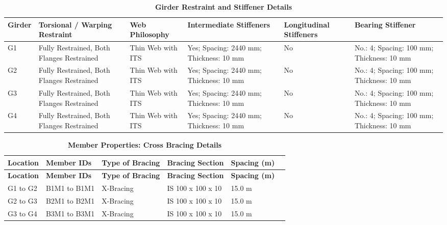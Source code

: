 \documentclass[12pt,a4paper]{report}
\numberwithin{table}{chapter}
\numberwithin{figure}{chapter}
\begin{document}
\vspace{0.6em}

\vspace{4pt}
\begin{table}[H]
\centering
\caption{\textbf{Girder Restraint and Stiffener Details}}
\begin{tabular}{|L{1.4cm}|p{2.2cm}|p{2.2cm}|p{3.0cm}|p{2.4cm}|p{2.2cm}|}
\hline
\textbf{Girder} & \textbf{Torsional / Warping Restraint} & \textbf{Web Philosophy} & \textbf{Intermediate Stiffeners} & \textbf{Longitudinal Stiffeners} & \textbf{Bearing Stiffener} \\[6pt]
\hline
G1 & Fully Restrained, Both Flanges Restrained & Thin Web with ITS & Yes; Spacing: 2440 mm; Thickness: 10 mm & No & No.: 4; Spacing: 100 mm; Thickness: 10 mm \\[8pt]
\hline
G2 & Fully Restrained, Both Flanges Restrained & Thin Web with ITS & Yes; Spacing: 2440 mm; Thickness: 10 mm & No & No.: 4; Spacing: 100 mm; Thickness: 10 mm \\[8pt]
\hline
G3 & Fully Restrained, Both Flanges Restrained & Thin Web with ITS & Yes; Spacing: 2440 mm; Thickness: 10 mm & No & No.: 4; Spacing: 100 mm; Thickness: 10 mm \\[8pt]
\hline
G4 & Fully Restrained, Both Flanges Restrained & Thin Web with ITS & Yes; Spacing: 2440 mm; Thickness: 10 mm & No & No.: 4; Spacing: 100 mm; Thickness: 10 mm \\[8pt]
\hline
\end{tabular}
\end{table}



\newpage

\vspace{0.4em}
\setlength{\tabcolsep}{3pt}
\setlength\LTleft{0pt}
\setlength\LTright{\fill}

\begin{longtable}{|L{2.2cm}|L{2.2cm}|L{3.0cm}|L{2.5cm}|C{1.8cm}|C{1.8cm}|}
\caption{\textbf{Member Properties: Cross Bracing Details}}
\hline
\textbf{Location} & \textbf{Member IDs} & \textbf{Type of Bracing} & \textbf{Bracing Section} & \textbf{Spacing (m)} \\
\hline
\endfirsthead
\hline
\textbf{Location} & \textbf{Member IDs} & \textbf{Type of Bracing} & \textbf{Bracing Section} & \textbf{Spacing (m)} \\
\hline
\endhead
G1 to G2 & B1M1 to B1M1 & X-Bracing & IS 100 x 100 x 10 & 15.0 m \\[6pt]
\hline
G2 to G3 & B2M1 to B2M1 & X-Bracing & IS 100 x 100 x 10 & 15.0 m \\[6pt]
\hline
G3 to G4 & B3M1 to B3M1 & X-Bracing & IS 100 x 100 x 10 & 15.0 m \\[6pt]
\hline
\end{longtable}
\end{document}
